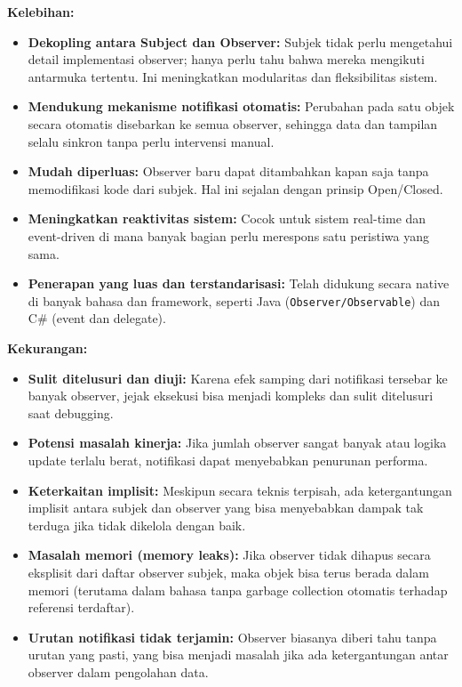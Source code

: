 \textbf{Kelebihan:}
\begin{itemize}
	\item \textbf{Dekopling antara Subject dan Observer:} Subjek tidak perlu mengetahui detail implementasi observer; hanya perlu tahu bahwa mereka mengikuti antarmuka tertentu. Ini meningkatkan modularitas dan fleksibilitas sistem.
	
	\item \textbf{Mendukung mekanisme notifikasi otomatis:} Perubahan pada satu objek secara otomatis disebarkan ke semua observer, sehingga data dan tampilan selalu sinkron tanpa perlu intervensi manual.
	
	\item \textbf{Mudah diperluas:} Observer baru dapat ditambahkan kapan saja tanpa memodifikasi kode dari subjek. Hal ini sejalan dengan prinsip Open/Closed.
	
	\item \textbf{Meningkatkan reaktivitas sistem:} Cocok untuk sistem real-time dan event-driven di mana banyak bagian perlu merespons satu peristiwa yang sama.
	
	\item \textbf{Penerapan yang luas dan terstandarisasi:} Telah didukung secara native di banyak bahasa dan framework, seperti Java (\texttt{Observer/Observable}) dan C\# (event dan delegate).
\end{itemize}

\textbf{Kekurangan:}
\begin{itemize}
	\item \textbf{Sulit ditelusuri dan diuji:} Karena efek samping dari notifikasi tersebar ke banyak observer, jejak eksekusi bisa menjadi kompleks dan sulit ditelusuri saat debugging.
	
	\item \textbf{Potensi masalah kinerja:} Jika jumlah observer sangat banyak atau logika update terlalu berat, notifikasi dapat menyebabkan penurunan performa.
	
	\item \textbf{Keterkaitan implisit:} Meskipun secara teknis terpisah, ada ketergantungan implisit antara subjek dan observer yang bisa menyebabkan dampak tak terduga jika tidak dikelola dengan baik.
	
	\item \textbf{Masalah memori (memory leaks):} Jika observer tidak dihapus secara eksplisit dari daftar observer subjek, maka objek bisa terus berada dalam memori (terutama dalam bahasa tanpa garbage collection otomatis terhadap referensi terdaftar).
	
	\item \textbf{Urutan notifikasi tidak terjamin:} Observer biasanya diberi tahu tanpa urutan yang pasti, yang bisa menjadi masalah jika ada ketergantungan antar observer dalam pengolahan data.
\end{itemize}

